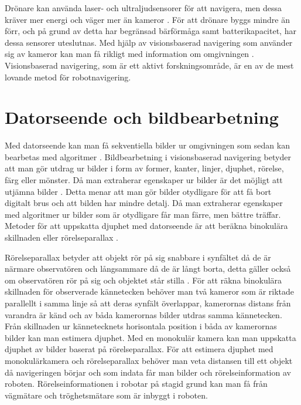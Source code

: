 Drönare kan använda laser- och ultraljudsensorer för att navigera, men dessa kräver mer energi och väger mer än kameror \citep{6385934}. För att drönare byggs mindre än förr, och på grund av detta har begränsad bärförmåga samt batterikapacitet, har dessa sensorer uteslutnas. Med hjälp av visionsbaserad navigering som använder sig av kameror kan man få rikligt med information om omgivningen \citep{geospatial}. Visionsbaserad navigering, som är ett aktivt forskningsområde, är en av de mest lovande metod för robotnavigering.

\section{Datorseende och bildbearbetning}

Med datorseende kan man få sekventiella bilder ur omgivningen som sedan kan bearbetas med algoritmer \citep{982903}. Bildbearbetning i visionsbaserad navigering betyder att man gör utdrag ur bilder i form av former, kanter, linjer, djuphet, rörelse, färg eller mönster. Då man extraherar egenskaper ur bilder är det möjligt att utjämna bilder \citep{mapbuildingsift}. Detta menar att man gör bilder otydligare för att få bort digitalt brus och att bilden har mindre detalj. Då man extraherar egenskaper med algoritmer ur bilder som är otydligare får man färre, men bättre träffar. Metoder för att uppskatta djuphet med datorseende är att beräkna binokulära skillnaden eller rörelseparallax \citep{suomimainittu}. 

Rörelseparallax betyder att objekt rör på sig snabbare i synfältet då de är närmare observatören och långsammare då de är långt borta, detta gäller också om observatören rör på sig och objektet står stilla \citep{suomimainittu, parallax}. För att räkna binokulära skillnaden för observerade kännetecken behöver man två kameror som är riktade parallellt i samma linje så att deras synfält överlappar, kamerornas distans från varandra är känd och av båda kamerornas bilder utdras samma kännetecken. Från skillnaden ur kännetecknets horisontala position i båda av kamerornas bilder kan man estimera djuphet. Med en monokulär kamera kan man uppskatta djuphet av bilder baserat på rörelseparallax. För att estimera djuphet med monokulärkamera och rörelseparallax behöver man veta distansen till ett objekt då navigeringen börjar och som indata får man bilder och rörelseinformation av roboten. Rörelseinformationen i robotar på stagid grund kan man få från vägmätare och tröghetsmätare som är inbyggt i roboten.

